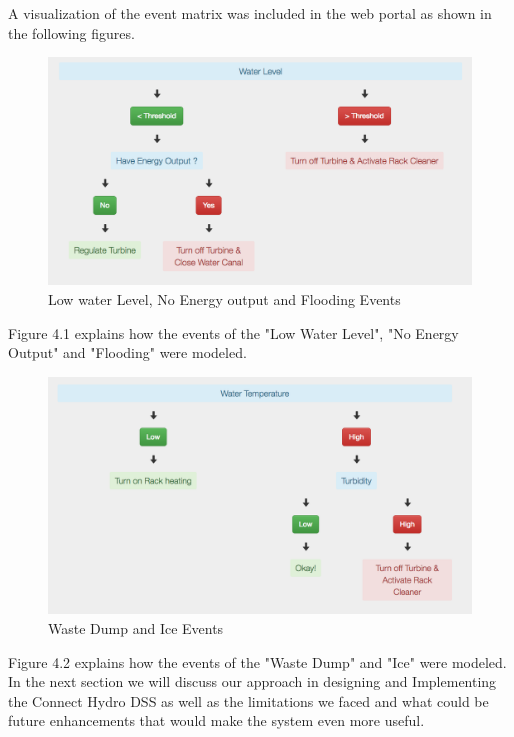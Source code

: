 A visualization of the event matrix was included in the web portal as shown in the following figures.
\begin{figure}[H]
\centering
\includegraphics[scale=0.37]{Images/WaterLevel.png}
\caption[Low water Level, No Energy output and Flooding Events]{Low water Level, No Energy output and Flooding Events}
\end{figure}
Figure 4.1 explains how the events of the "Low Water Level", "No Energy Output" and "Flooding" were modeled.
\begin{figure}[H]
\centering
\includegraphics[scale=0.37]{Images/WaterTemperatureAndTurbidity.png}
\caption[Waste Dump and Ice Events]{Waste Dump and Ice Events}
\end{figure}
Figure 4.2 explains how the events of the "Waste Dump" and "Ice" were modeled.
In the next section we will discuss our approach in designing and Implementing the Connect Hydro DSS as well as the limitations we faced and what could be future enhancements that would make the system even more useful.
